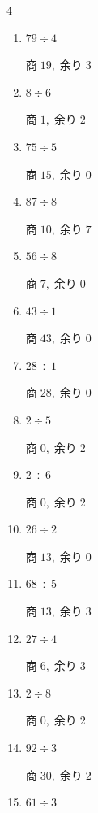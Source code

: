 \begin{multicols}{4}
\begin{enumerate}
  \item $79 \div 4$

        $商\; 19,\; 余り\; 3$

  \item $8 \div 6$

        $商\; 1,\; 余り\; 2$

  \item $75 \div 5$

        $商\; 15,\; 余り\; 0$

\columnbreak %

\resetques

  \item $87 \div 8$

        $商\; 10,\; 余り\; 7$

  \item $56 \div 8$

        $商\; 7,\; 余り\; 0$

  \item $43 \div 1$

        $商\; 43,\; 余り\; 0$

  \item $28 \div 1$

        $商\; 28,\; 余り\; 0$

  \item $2 \div 5$

        $商\; 0,\; 余り\; 2$

  \item $2 \div 6$

        $商\; 0,\; 余り\; 2$

  \item $26 \div 2$

        $商\; 13,\; 余り\; 0$

  \item $68 \div 5$

        $商\; 13,\; 余り\; 3$

  \item $27 \div 4$

        $商\; 6,\; 余り\; 3$

  \item $2 \div 8$

        $商\; 0,\; 余り\; 2$

  \item $92 \div 3$

        $商\; 30,\; 余り\; 2$

  \item $61 \div 3$


\end{enumerate}
\end{multicols}

